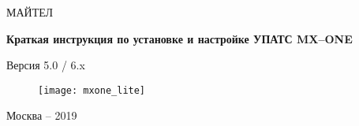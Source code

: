 \thispagestyle{empty}

\begin{center}
МАЙТЕЛ
\end{center}

\vspace{30mm}

\vspace{30mm}
\begin{center}
{\bf Краткая инструкция по установке и настройке УПАТС MX--ONE\par}
\vspace{10mm}
{%
Версия 5.0 / 6.x
}
\end{center}

\vspace{20mm}
\begin{figure}[h]
  \center
    \texttt{[image: mxone\_lite]}
    \label{img:mxone_lite}
\end{figure}

\vspace{50mm} \begin{center}
{Москва -- 2019}
\end{center}


\newpage
